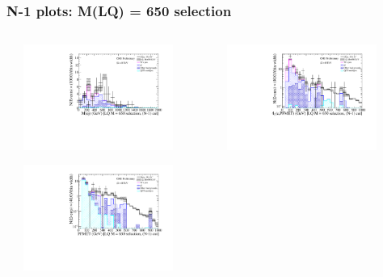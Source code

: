 \documentclass[bigger]{beamer}
\begin{document}
\begin{frame}
\frametitle{\enujj N-1 plots: M(LQ) = 650 selection}
\label{sec-1-13-2}
\begin{columns} %
\label{sec-1-13-2-1}
\begin{column}{0.55\textwidth}
\label{sec-1-13-2-1-1}
\label{sec-1-13-2-1-1-1}

\centering
\includegraphics[width=0.8\textwidth]{fig/enu/nMinus1/Mej_stAndMtAndMetLQ650_enujj.pdf}
\label{sec-1-13-2-1-1-2}

\centering
\includegraphics[width=0.8\textwidth]{fig/enu/nMinus1/MET_stAndMtAndMejLQ650_enujj.pdf}
\end{column}
\begin{column}{0.55\textwidth}
\label{sec-1-13-2-1-2}
\label{sec-1-13-2-1-2-1}

\centering
\includegraphics[width=0.8\textwidth]{fig/enu/nMinus1/MTenu_stAndMetAndMejLQ650_enujj.pdf}
\label{sec-1-13-2-1-2-2}


\end{column}
\end{columns}
\end{frame}
\end{document}
